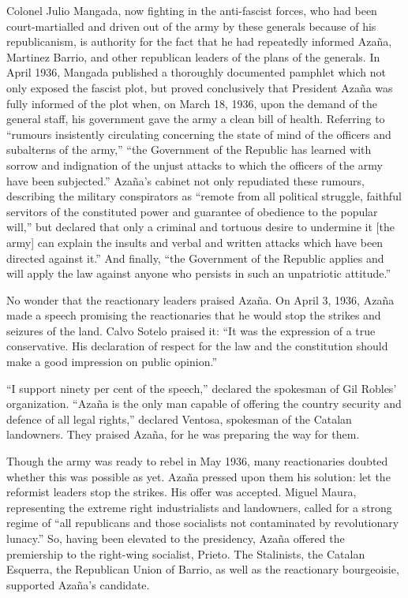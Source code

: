 Colonel Julio Mangada, now fighting in the anti-fascist forces, who had been court-martialled and driven out of the army by these generals because of his republicanism, is authority for the fact that he had repeatedly informed Azaña, Martinez Barrio, and other republican leaders of the plans of the generals. In April 1936, Mangada published a thoroughly documented pamphlet which not only exposed the fascist plot, but proved conclusively that President Azaña was fully informed of the plot when, on March 18, 1936, upon the demand of the general staff, his government gave the army a clean bill of health. Referring to ``rumours insistently circulating concerning the state of mind of the officers and subalterns of the army,'' ``the Government of the Republic has learned with sorrow and indignation of the unjust attacks to which the officers of the army have been subjected.'' Azaña’s cabinet not only repudiated these rumours, describing the military conspirators as ``remote from all political struggle, faithful servitors of the constituted power and guarantee of obedience to the popular will,'' but declared that only a criminal and tortuous desire to undermine it [the army] can explain the insults and verbal and written attacks which have been directed against it.'' And finally, ``the Government of the Republic applies and will apply the law against anyone who persists in such an unpatriotic attitude.''

No wonder that the reactionary leaders praised Azaña. On April 3, 1936, Azaña made a speech promising the reactionaries that he would stop the strikes and seizures of the land. Calvo Sotelo praised it: ``It was the expression of a true conservative. His declaration of respect for the law and the constitution should make a good impression on public opinion.''

``I support ninety per cent of the speech,'' declared the spokesman of Gil Robles’ organization. ``Azaña is the only man capable of offering the country security and defence of all legal rights,'' declared Ventosa, spokesman of the Catalan landowners. They praised Azaña, for he was preparing the way for them.

Though the army was ready to rebel in May 1936, many reactionaries doubted whether this was possible as yet. Azaña pressed upon them his solution: let the reformist leaders stop the strikes. His offer was accepted. Miguel Maura, representing the extreme right industrialists and landowners, called for a strong regime of ``all republicans and those socialists not contaminated by revolutionary lunacy.'' So, having been elevated to the presidency, Azaña offered the premiership to the right-wing socialist, Prieto. The Stalinists, the Catalan Esquerra, the Republican Union of Barrio, as well as the reactionary bourgeoisie, supported Azaña’s candidate.

